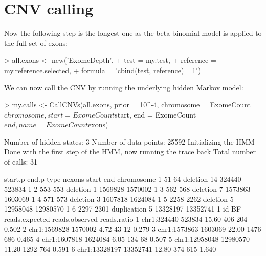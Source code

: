 \documentclass[10pt]{article}
\begin{document}
\section{CNV calling}
Now the following step is the longest one as the beta-binomial model is applied to the full set of exons:
\begin{Schunk}
\begin{Sinput}
> all.exons <- new('ExomeDepth',
+             test = my.test,
+             reference = my.reference.selected,
+             formula = 'cbind(test, reference) ~ 1')
\end{Sinput}
\end{Schunk}


We can now call the CNV by running the underlying hidden Markov model:
\begin{Schunk}
\begin{Sinput}
> my.calls <- CallCNVs(all.exons, prior = 10^-4, chromosome = ExomeCount$chromosome, start = ExomeCount$start, end = ExomeCount$end, name = ExomeCount$exons)
\end{Sinput}
\begin{Soutput}
Number of hidden states: 3
Number of data points: 25592
Initializing the HMM
Done with the first step of the HMM, now running the trace back
Total number of calls: 31
\end{Soutput}
\begin{Soutput}
  start.p end.p        type nexons    start      end chromosome
1      51    64    deletion     14   324440   523834          1
2     553   553    deletion      1  1569828  1570002          1
3     562   568    deletion      7  1573863  1603069          1
4     571   573    deletion      3  1607818  1624084          1
5    2258  2262    deletion      5 12958048 12980570          1
6    2297  2301 duplication      5 13328197 13352741          1
                      id    BF reads.expected reads.observed reads.ratio
1     chr1:324440-523834 15.60            406            204       0.502
2   chr1:1569828-1570002  4.72             43             12       0.279
3   chr1:1573863-1603069 22.00           1476            686       0.465
4   chr1:1607818-1624084  6.05            134             68       0.507
5 chr1:12958048-12980570 11.20           1292            764       0.591
6 chr1:13328197-13352741 12.80            374            615       1.640
\end{Soutput}
\end{Schunk}

\end{document}
